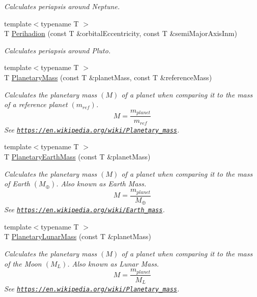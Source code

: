 \begin{DoxyCompactItemize}
\begin{DoxyCompactList}\small\item\em Calculates periapsis around Neptune. \end{DoxyCompactList}\item 
{\footnotesize template$<$typename T $>$ }\\T \mbox{\hyperlink{group___e_g_x_phys-_periapsis_ga1b844386674d15f7dc768f81b5770b93}{Perihadion}} (const T \&orbital\+Eccentricity, const T \&semi\+Major\+Axis\+Inm)
\begin{DoxyCompactList}\small\item\em Calculates periapsis around Pluto. \end{DoxyCompactList}\item 
{\footnotesize template$<$typename T $>$ }\\T \mbox{\hyperlink{group___e_g_x_phys-_planetary_mass_ga225bcf56fb37468f6d4d46493d403503}{Planetary\+Mass}} (const T \&planet\+Mass, const T \&reference\+Mass)
\begin{DoxyCompactList}\small\item\em Calculates the planetary mass $(M)$ of a planet when comparing it to the mass of a reference planet $(m_{ref})$. \[M=\frac{m_{planet}}{m_{ref}}\] See \href{https://en.wikipedia.org/wiki/Planetary_mass}{\tt https\+://en.\+wikipedia.\+org/wiki/\+Planetary\+\_\+mass}. \end{DoxyCompactList}\item 
{\footnotesize template$<$typename T $>$ }\\T \mbox{\hyperlink{group___e_g_x_phys-_planetary_mass_ga3d918c2d37a72b42b49aa6c3da08f450}{Planetary\+Earth\+Mass}} (const T \&planet\+Mass)
\begin{DoxyCompactList}\small\item\em Calculates the planetary mass $(M)$ of a planet when comparing it to the mass of Earth $(M_\oplus)$. Also known as Earth Mass. \[M=\frac{m_{planet}}{M_\oplus}\] See \href{https://en.wikipedia.org/wiki/Earth_mass}{\tt https\+://en.\+wikipedia.\+org/wiki/\+Earth\+\_\+mass}. \end{DoxyCompactList}\item 
{\footnotesize template$<$typename T $>$ }\\T \mbox{\hyperlink{group___e_g_x_phys-_planetary_mass_gaaea9675ef409d141d269d970f2f5e9dd}{Planetary\+Lunar\+Mass}} (const T \&planet\+Mass)
\begin{DoxyCompactList}\small\item\em Calculates the planetary mass $(M)$ of a planet when comparing it to the mass of the Moon $(M_L)$. Also known as Lunar Mass. \[M=\frac{m_{planet}}{M_L}\] See \href{https://en.wikipedia.org/wiki/Planetary_mass}{\tt https\+://en.\+wikipedia.\+org/wiki/\+Planetary\+\_\+mass}. \end{DoxyCompactList}\item 

\end{DoxyCompactItemize}
